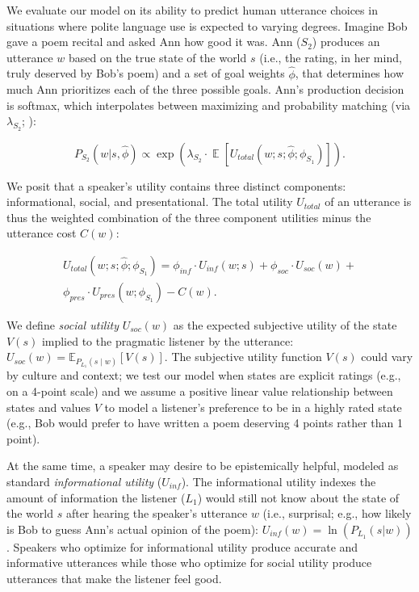 \documentclass[9pt,twocolumn,twoside,lineno]{main_class_file}
\begin{document}
We evaluate our model on its ability to predict human utterance choices
in situations where polite language use is expected to varying degrees.
Imagine Bob gave a poem recital and asked Ann how good it was.
Ann (\(S_2\)) produces an utterance \(w\) based on the true state of the world \(s\) (i.e., the
rating, in her mind, truly deserved by Bob's poem) and a set of goal weights
\(\hat{\phi}\), that determines how much Ann prioritizes each of the three possible goals.
Ann's production decision is softmax, which interpolates between
maximizing and probability matching (via \(\lambda_{S_2}\); \cite{goodman2013}):

\begin{equation}
P_{S_2}(w | s, \hat{\phi}) \propto \exp(\lambda_{S_2} \cdot \mathop{\mathbb{E}}[U_{total}(w; s; \hat{\phi}; \phi_{S_1})]).
\end{equation}

We posit that a speaker's utility contains three distinct components: informational, social, and presentational. The
total utility $U_{total}$ of an utterance is thus the weighted combination of the three component utilities minus the utterance cost \(C(w)\):

\begin{equation}
\begin{split}
U_{total}(w; s; \hat{\phi}; \phi_{S_1}) = \phi_{inf} \cdot U_{inf}(w; s) + \phi_{soc} \cdot U_{soc}(w) + \\ \phi_{pres} \cdot U_{pres}(w; \phi_{S_1}) - C(w).
\end{split}
\end{equation}

We define \emph{social utility} \(U_{soc}(w)\) as the expected subjective utility of the state \(V(s)\) implied to the
pragmatic listener by the utterance: \(U_{soc}(w) = \mathbb{E}_{P_{L_1}(s \mid w)}[V(s)]\).
The subjective utility function \(V(s)\) could vary by culture and context; we test our model when states are explicit ratings (e.g., on a 4-point scale) and we assume a positive linear value relationship between states and values \(V\) to model a listener's preference to be in a highly rated state (e.g., Bob would prefer to have written a poem deserving 4 points rather than 1 point).

At the same time, a speaker may desire to be epistemically helpful, modeled as standard \emph{informational utility} (\(U_{inf}\)).
The informational utility indexes the amount of information the listener (\(L_1\)) would still not know about the state of the world \(s\) after hearing the speaker's utterance \(w\) (i.e., surprisal; e.g., how likely is Bob to guess Ann's actual opinion of the poem): \(U_{inf}(w) = \ln(P_{L_1}(s | w))\).
Speakers who optimize for informational utility produce accurate and informative utterances while those who optimize for social utility produce utterances that make the listener feel good.
\end{document}
